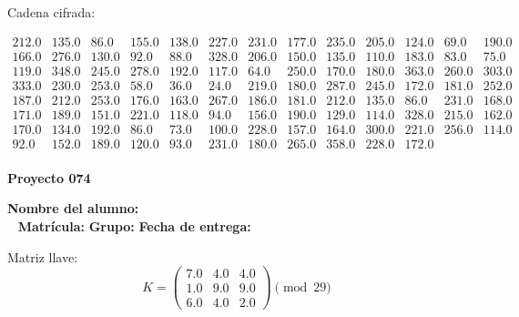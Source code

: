 \documentclass[12pt]{article}
\begin{document}
Cadena cifrada:
\begin{center}
$\begin{array}{lllllllllllll}
212.0 & 135.0 & 86.0 & 155.0 & 138.0 & 227.0 & 231.0 & 177.0 & 235.0 & 205.0 & 124.0 & 69.0 & 190.0\\
166.0 & 276.0 & 130.0 & 92.0 & 88.0 & 328.0 & 206.0 & 150.0 & 135.0 & 110.0 & 183.0 & 83.0 & 75.0\\
119.0 & 348.0 & 245.0 & 278.0 & 192.0 & 117.0 & 64.0 & 250.0 & 170.0 & 180.0 & 363.0 & 260.0 & 303.0\\
333.0 & 230.0 & 253.0 & 58.0 & 36.0 & 24.0 & 219.0 & 180.0 & 287.0 & 245.0 & 172.0 & 181.0 & 252.0\\
187.0 & 212.0 & 253.0 & 176.0 & 163.0 & 267.0 & 186.0 & 181.0 & 212.0 & 135.0 & 86.0 & 231.0 & 168.0\\
171.0 & 189.0 & 151.0 & 221.0 & 118.0 & 94.0 & 156.0 & 190.0 & 129.0 & 114.0 & 328.0 & 215.0 & 162.0\\
170.0 & 134.0 & 192.0 & 86.0 & 73.0 & 100.0 & 228.0 & 157.0 & 164.0 & 300.0 & 221.0 & 256.0 & 114.0\\
92.0 & 152.0 & 189.0 & 120.0 & 93.0 & 231.0 & 180.0 & 265.0 & 358.0 & 228.0 & 172.0\\
\end{array}$
\end{center}

\newpage


\textbf{Proyecto 074}

\textbf{Nombre del alumno:} \underline{\hspace{13cm}}\\\
\vspace{1cm}
\textbf{Matrícula:} \underline{\hspace{4cm}} \hspace{1cm}
\textbf{Grupo:} \underline{\hspace{2cm}}
\textbf{Fecha de entrega:} \underline{\hspace{2cm}}

\medskip

Matriz llave:
\[
K = \begin{pmatrix}
7.0 & 4.0 & 4.0\\
1.0 & 9.0 & 9.0\\
6.0 & 4.0 & 2.0
\end{pmatrix} \pmod{29}
\]
\end{document}
